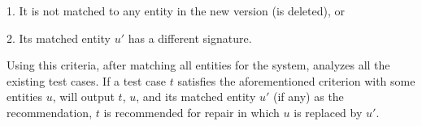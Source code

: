 1. It is not matched to any entity in the new version (\ie is deleted), or

2. Its matched entity $u'$ has a different signature.

Using this criteria, after matching all entities for the system,
{\tool} analyzes all the existing test cases. If a test case
$t$ satisfies the aforementioned criterion with some entities $u$, {\tool} will output $t$, $u$, and its matched entity $u'$ (if any) as the recommendation, \ie $t$ is recommended for repair in which $u$ is replaced by $u'$.

